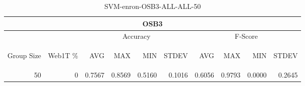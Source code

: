 \begin{center}
\begin{table}[htbp] 
 \begin{center}
\begin{tabular}{ | r | r | r | r | r | r | r | r | r | r |}
\hline
\multicolumn{10}{|c|}{OSB3}\\
\hline
 & & \multicolumn{4}{|c|}{Accuracy} & \multicolumn{4}{|c|}{F-Score}\\ \cline{3-10}
\begin{sideways}Group Size\end{sideways} & \begin{sideways}Web1T \%\end{sideways} & \begin{sideways}AVG\end{sideways} & \begin{sideways}MAX\end{sideways} & \begin{sideways}MIN\end{sideways} & \begin{sideways}STDEV\end{sideways} & \begin{sideways}AVG\end{sideways} & \begin{sideways}MAX\end{sideways} & \begin{sideways}MIN\end{sideways} & \begin{sideways}STDEV\end{sideways}\\
\hline
\multirow{0}{*}{50}
 & 0 & 0.7567 & 0.8569 & 0.5160 & 0.1016 & 0.6056 & 0.9793 & 0.0000 & 0.2645\\ \cline{2-10}
\hline
\end{tabular}
\caption{SVM-enron-OSB3-ALL-ALL-50}
\label{table:SVM-enron-OSB3-ALL-ALL-50}
\end{center}
 \end{table}
\end{center}

